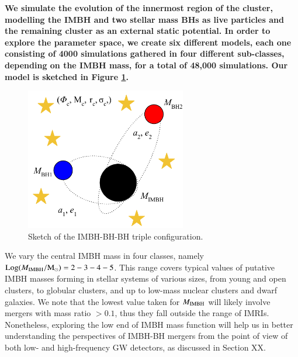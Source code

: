 \documentclass[article]{aa}
\newcommand{\Ms}{{\rm M}_\odot}
\newcommand{\ibh}{{\rm IMBH}}
\begin{document}
{\bf
We simulate the evolution of the innermost region of the cluster, modelling the IMBH and two stellar mass BHs as live particles and
the remaining cluster as an external static potential. In order to explore the parameter space, we create six different models, each one consisting 
of 4000 simulations gathered in four different sub-classes, depending on the IMBH mass, for a total of 48,000 simulations. Our model is sketched in Figure \ref{f1}. 

\begin{figure}
    \centering
    \includegraphics[width=7cm]{triple}
    \caption{Sketch of the IMBH-BH-BH triple configuration.}    
\label{f1}
\end{figure}

We vary the central IMBH mass in four classes, namely ${\rm Log}(M_\ibh/\Ms) = 2-3-4-5$. This range covers typical values of putative IMBH masses forming in stellar systems of various sizes, from young and open clusters, to globular clusters, and up to low-mass nuclear clusters and dwarf galaxies.
We note that the lowest value taken for $M_\ibh$ will likely involve mergers with mass ratio $> 0.1$, thus they fall outside the range of IMRIs. Nonetheless, exploring the low end of IMBH mass function will help us in better understanding the perspectives of IMBH-BH mergers from the point of view of both low- and high-frequency GW detectors, as discussed in Section XX.

}
\end{document}
